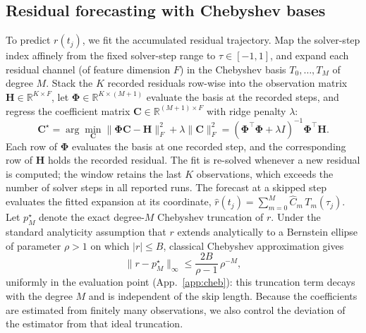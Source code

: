\documentclass{article} %
\begin{document}
\subsection{Residual forecasting with Chebyshev bases}
\label{sec:cheb}
To predict $r(t_j)$, we fit the accumulated residual trajectory. Map
the solver-step index affinely from the fixed solver-step range to
$\tau \in [-1,1]$, and expand each residual channel (of feature
dimension $F$) in the Chebyshev basis $T_0,\dots,T_M$ of degree $M$.
Stack the $K$ recorded residuals row-wise into the observation matrix
$\mathbf{H} \in \mathbb{R}^{K \times F}$, let
$\mathbf{\Phi} \in \mathbb{R}^{K \times (M+1)}$ evaluate the basis at
the recorded steps, and regress the coefficient matrix
$\mathbf{C} \in \mathbb{R}^{(M+1) \times F}$ with ridge penalty
$\lambda$:
\begin{equation}
  \mathbf{C}^\star = \arg\min_{\mathbf{C}}
  \|\mathbf{\Phi}\mathbf{C} - \mathbf{H}\|_F^2
  + \lambda\|\mathbf{C}\|_F^2
  = (\mathbf{\Phi}^\top\mathbf{\Phi} + \lambda I)^{-1}
    \mathbf{\Phi}^\top \mathbf{H}.
  \label{eq:ridge}
\end{equation}
Each row of $\mathbf{\Phi}$ evaluates the basis at one recorded step,
and the corresponding row of $\mathbf{H}$ holds the recorded residual.
The fit is re-solved whenever a new residual is computed; the window
retains the last $K$ observations, which exceeds the number of solver
steps in all reported runs. The forecast at a skipped step
evaluates the fitted expansion at its coordinate,
$\hat{r}(t_j) = \sum_{m=0}^{M} \hat{C}_m\,T_m(\tau_j)$. Let
$p_M^\star$ denote the exact degree-$M$ Chebyshev truncation of $r$.
Under the standard analyticity assumption that $r$ extends analytically
to a Bernstein ellipse of parameter $\rho>1$ on which $|r| \le B$,
classical Chebyshev approximation gives~\citep[Thm.~3.2]{spectrum}
\begin{equation}
  \|r - p_M^\star\|_\infty \le \frac{2B}{\rho-1}\,\rho^{-M},
  \label{eq:cheb}
\end{equation}
uniformly in the evaluation point (App.~\ref{app:cheb}): this
truncation term decays with the degree $M$ and is independent of the
skip length. Because the coefficients are estimated from finitely many
observations, we also control the deviation of the estimator from that
ideal truncation.
\end{document}
